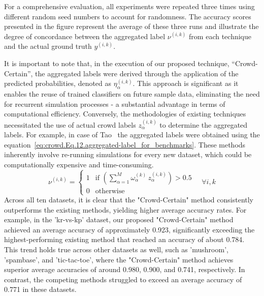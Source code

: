 For a comprehensive evaluation, all experiments were repeated three times using different random seed numbers to account for randomness. The accuracy scores presented in the figure represent the average of these three runs and illustrate the degree of concordance between the aggregated label $\nu^{(i,k)}$ from each technique and the actual ground truth $y^{(i,k)}$.

It is important to note that, in the execution of our proposed technique, ``Crowd-Certain'', the aggregated labels were derived through the application of the predicted probabilities, denoted as $\eta_{\alpha}^{(i,k)}$. This approach is significant as it enables the reuse of trained classifiers on future sample data, eliminating the need for recurrent simulation processes - a substantial advantage in terms of computational efficiency. Conversely, the methodologies of existing techniques necessitated the use of actual crowd labels $z_\alpha^{(i,k)}$ to determine the aggregated labels. For example, in case of Tao~\cite{tao_Label_2020} the aggregated labels were obtained using the equation~\ref{eq:crowd.Eq.12.aggregated-label_for_benchmarks}. These methods inherently involve re-running simulations for every new dataset, which could be computationally expensive and time-consuming.
%
\begin{equation}
    \nu^{(i,k)} =
    \begin{cases}
        1 & \text{if } \left(\sum_{\alpha=1}^{M} \omega_{\alpha}^{(k)}\, z_{\alpha}^{(i,k)}\right) > 0.5 \\
        0 & \text{otherwise}
    \end{cases}
    \quad \forall i, k
    \label{eq:crowd.Eq.12.aggregated-label_for_benchmarks}
\end{equation}
%
Across all ten datasets, it is clear that the "Crowd-Certain" method consistently outperforms the existing methods, yielding higher average accuracy rates. For example, in the 'kr-vs-kp' dataset, our proposed "Crowd-Certain" method achieved an average accuracy of approximately 0.923, significantly exceeding the highest-performing existing method that reached an accuracy of about 0.784. This trend holds true across other datasets as well, such as 'mushroom', 'spambase', and 'tic-tac-toe', where the "Crowd-Certain" method achieves superior average accuracies of around 0.980, 0.900, and 0.741, respectively. In contrast, the competing methods struggled to exceed an average accuracy of 0.771 in these datasets.
%
